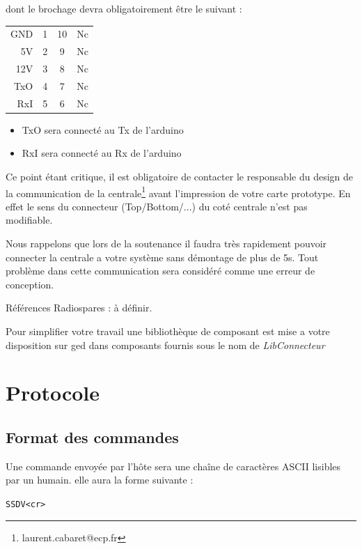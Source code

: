 \documentclass[a4paper, 10pt]{article} %
\begin{document}
dont le brochage devra obligatoirement être le suivant :

\begin{center}
\begin{tabular}{r|c||c|l}
GND&1&10&Nc\\
5V&2&9&Nc\\
12V&3&8&Nc\\
TxO&4&7&Nc\\
RxI&5&6&Nc\\
\end{tabular}
\end{center}


\begin{itemize}
\item TxO sera connecté au Tx de l'arduino
\item RxI sera connecté au Rx de l'arduino
\end{itemize}


Ce point étant critique, il est obligatoire de contacter le responsable du design de la communication de la centrale\footnote{laurent.cabaret@ecp.fr} avant l'impression  de votre carte prototype.
En effet le sens du connecteur (Top/Bottom/...) du coté centrale n'est pas modifiable.

Nous rappelons que lors de la soutenance il faudra très rapidement pouvoir connecter la centrale a votre système sans démontage de plus de 5s. Tout problème dans cette communication sera considéré comme une erreur de conception.

Références Radiospares : à définir.

Pour simplifier votre travail une bibliothèque de composant est mise a votre disposition sur ged dans composants fournis sous le nom de \emph{LibConnecteur}

\section{Protocole}

\subsection{Format des commandes}

Une commande envoyée par l'hôte sera une chaîne de caractères ASCII lisibles par un humain. elle aura la
forme suivante :
\begin{center}
  \verb|SSDV<cr>|
\end{center}
\end{document}
